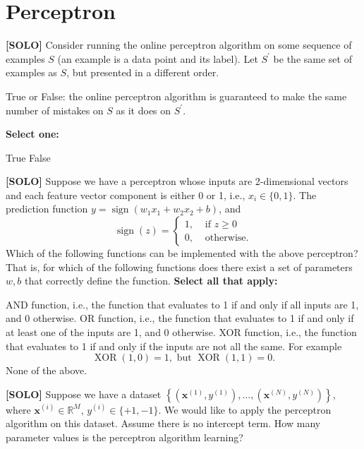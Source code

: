 \documentclass[11pt,addpoints,answers]{exam}
\newcommand{\xv}{\mathbf{x}}
\begin{document}
\section{Perceptron}
\begin{questions}
    \question[1] \textbf{[SOLO]} Consider running the online perceptron algorithm on some sequence of examples $S$ (an example is a data point and its label). Let $S^\prime$ be the same set of examples as $S$, but presented in a different order.
    
    True or False: the online perceptron algorithm is guaranteed to make the same number of mistakes on $S$ as it does on $S^\prime$.

    \textbf{Select one:}
    \begin{checkboxes}
        \choice True
        \CorrectChoice False
    \end{checkboxes}


    
    \question[3] \textbf{[SOLO]} Suppose we have a perceptron whose inputs are 2-dimensional vectors and each feature vector component is either 0 or 1, i.e., $x_i \in \{0,1\}$. The prediction function $y = \operatorname{sign}(w_1x_1 + w_2x_2 + b)$, and
    $$
    \operatorname{sign}(z) = 
    \begin{cases}
    1, & \textrm{ if } z \geq 0\\
    0, & \textrm{ otherwise}.
    \end{cases}
    $$
    Which of the following functions can be implemented with the above perceptron? That is, for which of the following functions does there exist a set of parameters $w,b$ that correctly define the function. 
    \textbf{Select all that apply:}
    {
    \checkboxchar{$\Box$} \checkedchar{$\blacksquare$}
    \begin{checkboxes}
        \CorrectChoice AND function, i.e., the function that evaluates to 1 if and only if all inputs are 1, and 0 otherwise.
        \CorrectChoice OR function, i.e., the function that evaluates to 1 if and only if at least one of the inputs are 1, and 0 otherwise.
        \choice XOR function, i.e., the function that evaluates to 1 if and only if the inputs are not all the same. For example
        $$
        \operatorname{XOR}(1,0) = 1, \textrm{ but } \operatorname{XOR}(1,1) = 0.
        $$
        \choice None of the above.
    \end{checkboxes}
    }

    
    
    
    \question[2] \textbf{[SOLO]} Suppose we have a dataset $\left\{ \left(\xv^{(1)},y^{(1)}\right),\ldots, \left(\xv^{(N)},y^{(N)}\right) \right\}$, where $\xv^{(i)} \in \mathbb{R}^M$, $y^{(i)}\in\{+1,-1\}$. We would like to apply the perceptron algorithm on this dataset. Assume there is no intercept term. How many parameter values is the perceptron algorithm learning?


\end{questions}
\end{document}
